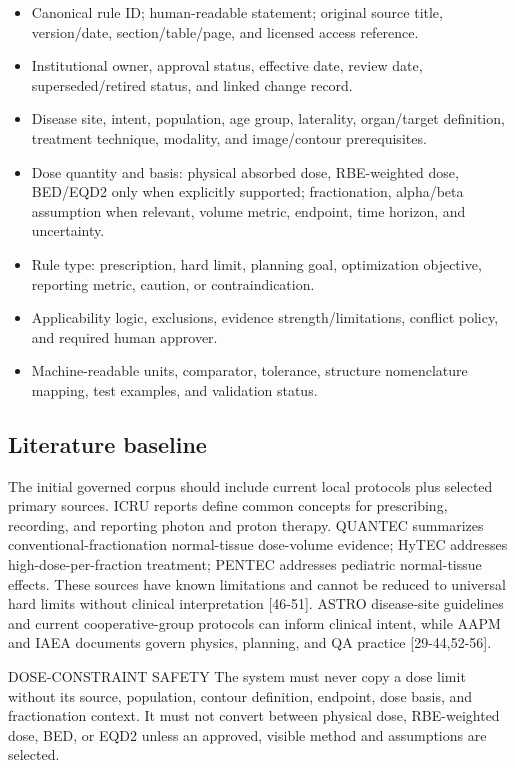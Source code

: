 \documentclass[11pt,letterpaper]{article}
\begin{document}
\begin{itemize}
\item Canonical rule ID; human-readable statement; original source title, version\slash\allowbreak{}date, section\slash\allowbreak{}table\slash\allowbreak{}page, and licensed access reference.
\item Institutional owner, approval status, effective date, review date, superseded\slash\allowbreak{}retired status, and linked change record.
\item Disease site, intent, population, age group, laterality, organ\slash\allowbreak{}target definition, treatment technique, modality, and image\slash\allowbreak{}contour prerequisites.
\item Dose quantity and basis: physical absorbed dose, RBE-weighted dose, BED\slash\allowbreak{}EQD2 only when explicitly supported; fractionation, alpha\slash\allowbreak{}beta assumption when relevant, volume metric, endpoint, time horizon, and uncertainty.
\item Rule type: prescription, hard limit, planning goal, optimization objective, reporting metric, caution, or contraindication.
\item Applicability logic, exclusions, evidence strength\slash\allowbreak{}limitations, conflict policy, and required human approver.
\item Machine-readable units, comparator, tolerance, structure nomenclature mapping, test examples, and validation status.
\end{itemize}

\subsection{Literature baseline}

The initial governed corpus should include current local protocols plus selected primary sources. ICRU reports define common concepts for prescribing, recording, and reporting photon and proton therapy. QUANTEC summarizes conventional-fractionation normal-tissue dose-volume evidence; HyTEC addresses high-dose-per-fraction treatment; PENTEC addresses pediatric normal-tissue effects. These sources have known limitations and cannot be reduced to universal hard limits without clinical interpretation [46-51]. ASTRO disease-site guidelines and current cooperative-group protocols can inform clinical intent, while AAPM and IAEA documents govern physics, planning, and QA practice [29-44,52-56].

\begin{nlnotice}{DOSE-CONSTRAINT SAFETY}
The system must never copy a dose limit without its source, population, contour definition, endpoint, dose basis, and fractionation context. It must not convert between physical dose, RBE-weighted dose, BED, or EQD2 unless an approved, visible method and assumptions are selected.
\end{nlnotice}
\end{document}
